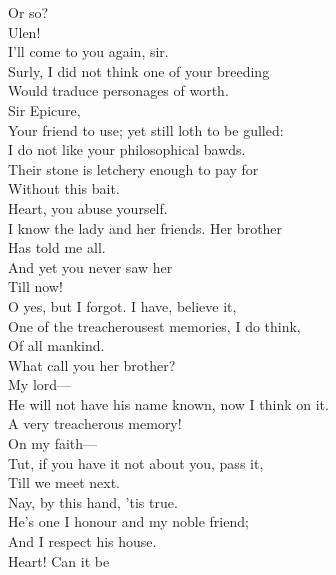 \documentclass[a4paper,oneside,12pt]{memoir}
\begin{document}
\begin{drama*}
Or so?\\
\subtlespeaks {}  Ulen!\\
\facespeaks {} I'll come to you again, sir.\\
\mammonspeaks Surly, I did not think one of your breeding\\
Would traduce personages of worth.\\
\surlyspeaks {} Sir Epicure,\\
Your friend to use; yet still loth to be gulled:\\
I do not like your philosophical bawds.\\
Their stone is letchery enough to pay for\\
Without this bait.\\
\mammonspeaks {} Heart, you abuse yourself.\\
I know the lady and her friends. Her brother\\
Has told me all.\\
\surlyspeaks {} And yet you never saw her\\
Till now!\\
\mammonspeaks {} O yes, but I forgot. I have, believe it,\\
One of the treacherousest memories, I do think,\\
Of all mankind.\\
\surlyspeaks {} What call you her brother?\\
\mammonspeaks {} My lord---\\
He will not have his name known, now I think on it.\\
\surlyspeaks A very treacherous memory!\\
\mammonspeaks {} On my faith---\\
\surlyspeaks Tut, if you have it not about you, pass it,\\
Till we meet next.\\
\mammonspeaks {} Nay, by this hand, 'tis true.\\
He's one I honour and my noble friend;\\
And I respect his house.\\
\surlyspeaks {} Heart! Can it be\\

\end{drama*}
\end{document}
